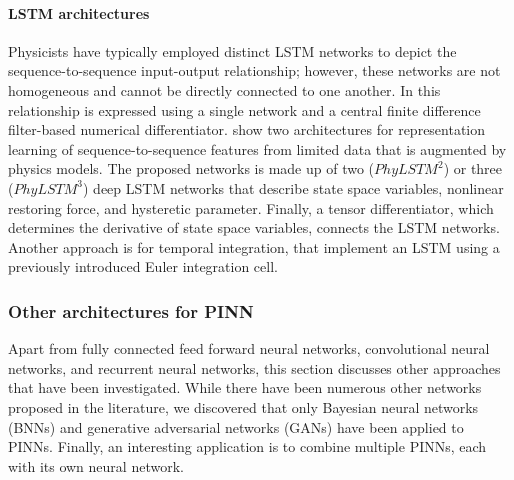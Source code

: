 \documentclass[pdflatex,sn-basic]{sn-jnl}%
\theoremstyle{thmstyleone}%
\theoremstyle{thmstyletwo}%
\theoremstyle{thmstylethree}%
\begin{document}
\paragraph{LSTM architectures}
Physicists have typically employed distinct LSTM networks to depict the sequence-to-sequence input-output relationship; however, these networks are not homogeneous and cannot be directly connected to one another.
%
In \cite{Zha2020_PhysicsInformedMulti_LiuZLS} this relationship is expressed using a single network and a central finite difference filter-based numerical differentiator.
\cite{Zha2020_PhysicsInformedMulti_LiuZLS} show two architectures 
for representation learning of sequence-to-sequence features from limited data that is augmented by physics models.
The proposed networks 
is made up of two ($PhyLSTM^2$) or three ($PhyLSTM^3$) deep LSTM networks that describe state space variables, nonlinear restoring force, and hysteretic parameter. Finally, a tensor differentiator, which determines the derivative of state space variables, connects the LSTM networks.
\\
\noindent
Another approach is \cite{Yuc2021_HybridPhysicsInformed_ViaYV}
for temporal integration, that implement an LSTM using a previously introduced Euler integration cell.





\subsubsection{Other architectures for PINN}

Apart from fully connected feed forward neural networks, convolutional neural networks, and recurrent neural networks, this section discusses other approaches that have been investigated. While there have been numerous other networks proposed in the literature, we discovered that only Bayesian neural networks (BNNs) and generative adversarial networks (GANs) have been applied to PINNs. Finally, an interesting application is to combine multiple PINNs, each with its own neural network. 


\end{document}
